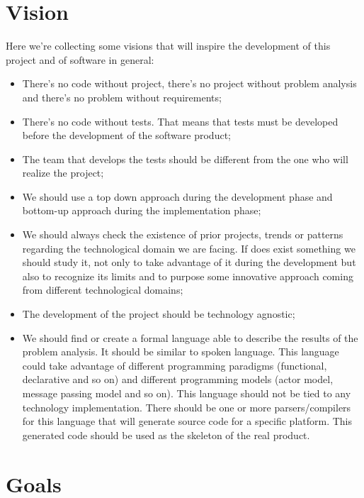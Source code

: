 \documentclass{llncs}
\newcommand{\labelsec}[1]{\label{sec:#1}}
\begin{document}
\section{Vision}
\labelsec{Vision}
Here we're collecting some visions that will inspire the development of this project and of software in general:\\
\begin{itemize}
	\item There's no code without project, there's no project without problem analysis and there's no problem without requirements;
	\item There's no code without tests. That means that tests must be developed before the development of the software product;
	\item The team that develops the tests should be different from the one who will realize the project;
	\item We should use a top down approach during the development phase and bottom-up approach during the implementation phase;
	\item We should always check the existence of prior projects, trends or patterns regarding the technological domain we are facing. If does exist something we should study it, not only to take advantage of it during the development but also to recognize its limits and to purpose some innovative approach coming from different technological domains;
	\item The development of the project should be technology agnostic;
	\item We should find or create a formal language able to describe the results of the problem analysis. It should be similar to spoken language. This language could take advantage of different programming paradigms (functional, declarative and so on) and different programming models (actor model, message passing model and so on). This language should not be tied to any technology implementation. There should be one or more parsers/compilers for this language that will generate source code for a specific platform. This generated code should be used as the skeleton of the real product.
\end{itemize}

\section{Goals}
\end{document}
